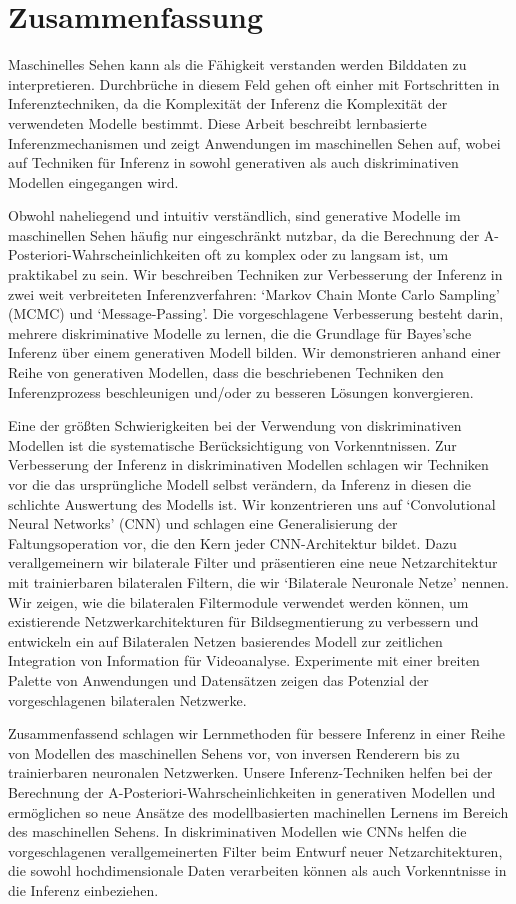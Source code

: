 \chapter{Zusammenfassung}

Maschinelles Sehen kann als die F\"ahigkeit verstanden werden Bilddaten zu interpretieren. Durchbr\"uche in diesem Feld gehen oft einher mit Fortschritten in Inferenztechniken, da die Komplexit\"at der Inferenz die Komplexit\"at der verwendeten Modelle bestimmt. Diese Arbeit beschreibt lernbasierte Inferenzmechanismen und zeigt Anwendungen im maschinellen Sehen auf, wobei auf Techniken f\"ur Inferenz in sowohl generativen als auch diskriminativen Modellen eingegangen wird.


Obwohl naheliegend und intuitiv verst\"andlich, sind generative Modelle im maschinellen Sehen h\"aufig nur eingeschr\"ankt nutzbar, da die Berechnung der A-Posteriori-Wahrscheinlichkeiten oft zu komplex oder zu langsam ist, um praktikabel zu sein. Wir beschreiben Techniken zur Verbesserung der Inferenz in zwei weit verbreiteten Inferenzverfahren: `Markov Chain Monte Carlo Sampling' (MCMC) und `Message-Passing'. Die vorgeschlagene Verbesserung besteht darin, mehrere diskriminative Modelle zu lernen, die die Grundlage f\"ur Bayes'sche Inferenz \"uber einem generativen Modell bilden. Wir demonstrieren anhand einer Reihe von generativen Modellen, dass die beschriebenen Techniken den Inferenzprozess beschleunigen und/oder zu besseren L\"osungen konvergieren.


Eine der gr\"o{\ss}ten Schwierigkeiten bei der Verwendung von diskriminativen Modellen ist die systematische Ber\"ucksichtigung von Vorkenntnissen. Zur Verbesserung der Inferenz in diskriminativen Modellen schlagen wir Techniken vor die das ursprüngliche Modell selbst verändern, da Inferenz in diesen die schlichte Auswertung des Modells ist. Wir konzentrieren uns auf `Convolutional Neural Networks' (CNN) und schlagen eine Generalisierung der Faltungsoperation vor, die den Kern jeder CNN-Architektur bildet. Dazu verallgemeinern wir bilaterale Filter und pr\"asentieren eine neue Netzarchitektur mit trainierbaren bilateralen Filtern, die wir `Bilaterale Neuronale Netze' nennen. Wir zeigen, wie die bilateralen Filtermodule verwendet werden können, um existierende Netzwerkarchitekturen für Bildsegmentierung zu verbessern und entwickeln ein auf Bilateralen Netzen basierendes Modell zur zeitlichen Integration von Information für Videoanalyse. Experimente mit einer breiten Palette von Anwendungen und Datens\"atzen zeigen das Potenzial der vorgeschlagenen bilateralen Netzwerke.


Zusammenfassend schlagen wir Lernmethoden f\"ur bessere Inferenz in einer Reihe von Modellen des maschinellen Sehens vor, von inversen Renderern bis zu trainierbaren neuronalen Netzwerken. Unsere Inferenz-Techniken helfen bei der Berechnung der A-Posteriori-Wahrscheinlichkeiten in generativen Modellen und erm\"oglichen so neue Ans\"atze des modellbasierten machinellen Lernens im Bereich des maschinellen Sehens. In diskriminativen Modellen wie CNNs helfen die vorgeschlagenen verallgemeinerten Filter beim Entwurf neuer Netzarchitekturen, die sowohl hochdimensionale Daten verarbeiten k\"onnen als auch Vorkenntnisse in die Inferenz einbeziehen.
